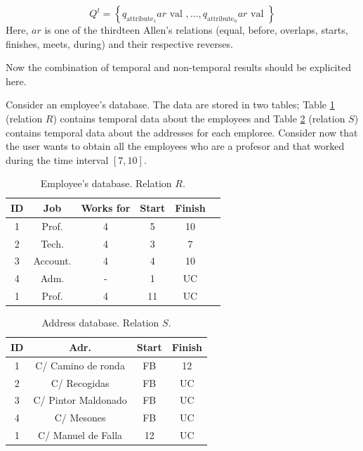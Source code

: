 \documentclass{llncs}
\begin{document}
\begin{equation}
\label{eq:temporal-constratins}
Q^{t} = \left \lbrace q_{\mbox{attribute}_1}  ar \mbox{ val }, \ldots, q_{\mbox{attribute}_n}  ar \mbox{ val } \right \rbrace
\end{equation}
Here, $ar$ is one of the thirdteen Allen's relations (equal, before, overlaps, starts, finishes, meets, during) and their respective reverses.


Now the combination of temporal and non-temporal results should be explicited here.
\begin{example}
Consider an employee's database. The data are stored in two tables; Table \ref{table:employees} (relation $R$) contains temporal data about the employees and Table \ref{table:address} (relation $S$) contains temporal  data about the addresses for each emploree. Consider now that the user wants to obtain all the employees who are a profesor and that worked during the time interval $\left[7, 10 \right]$.

\begin{table}
\centering
\caption{Employee's database. Relation $R$.}

\begin{tabular}{c c c c c c }
\hline
ID & Job & Works for & Start & Finish \\ \hline
1 & Prof. & 4 & 5 & 10 \\
2 & Tech. & 4 & 3 & 7 \\
3 & Account. & 4  & 4 & 10 \\
4 & Adm. & - & 1 & UC \\
1 & Prof. & 4 & 11 & UC \\
\hline 
\end{tabular}
\label{table:employees}



\end{table}



\begin{table}
\centering
\caption{Address database. Relation $S$.}

\begin{tabular}{c c c c }
\hline
ID & Adr. & Start & Finish \\ \hline
1 & C/ Camino de ronda & FB & 12 \\
2 & C/ Recogidas & FB & UC \\ 
3 & C/ Pintor Maldonado & FB & UC \\
4 & C/ Mesones & FB & UC \\
1 & C/ Manuel de Falla & 12 & UC \\
\hline 
\end{tabular}
\label{table:address}


\end{table}
\end{example}
\end{document}
